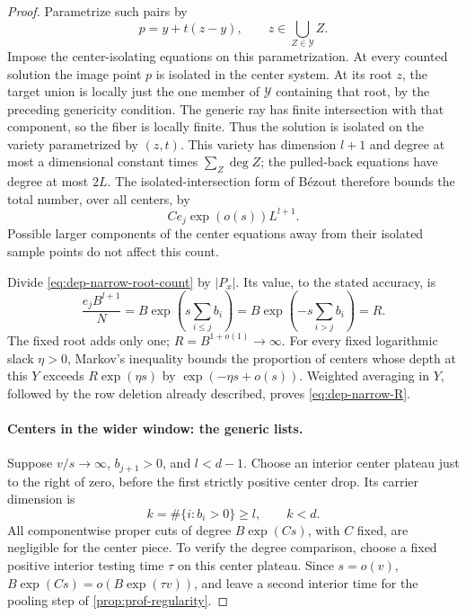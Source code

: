 \begin{proof}
Parametrize such pairs by
\[
 p=y+t(z-y),\qquad z\in\bigcup_{Z\in\mathcal{Y}}Z.
\]
Impose the center-isolating equations on this parametrization. At every counted solution the image point $p$ is isolated in the center system. At its root $z$, the target union is locally just the one member of $\mathcal{Y}$ containing that root, by the preceding genericity condition. The generic ray has finite intersection with that component, so the fiber is locally finite. Thus the solution is isolated on the variety parametrized by $(z,t)$. This variety has dimension $l+1$ and degree at most a dimensional constant times $\sum_Z\deg Z$; the pulled-back equations have degree at most $2L$. The isolated-intersection form of B\'ezout therefore bounds the total number, over all centers, by
\begin{equation}\label{eq:dep-narrow-root-count}
 C e_j\exp(o(s))L^{l+1}.
\end{equation}
Possible larger components of the center equations away from their isolated sample points do not affect this count.

Divide \eqref{eq:dep-narrow-root-count} by $|P_x|$. Its value, to the stated accuracy, is
\[
 \frac{e_j B^{l+1}}{N}
 =B\exp\left(s\sum_{i\le j}b_i\right)
 =B\exp\left(-s\sum_{i>j}b_i\right)=R.
\]
The fixed root adds only one; $R=B^{1+o(1)}\to\infty$. For every fixed logarithmic slack $\eta>0$, Markov's inequality bounds the proportion of centers whose depth at this $Y$ exceeds $R\exp(\eta s)$ by $\exp(-\eta s+o(s))$. Weighted averaging in $Y$, followed by the row deletion already described, proves \eqref{eq:dep-narrow-R}.

\paragraph{Centers in the wider window: the generic lists.}
Suppose $v/s\to\infty$, $b_{j+1}>0$, and $l<d-1$. Choose an interior center plateau just to the right of zero, before the first strictly positive center drop. Its carrier dimension is
\[
 k=\#\{i:b_i>0\}\ge l,
 \qquad k<d.
\]
All componentwise proper cuts of degree $B\exp(Cs)$, with $C$ fixed, are negligible for the center piece. To verify the degree comparison, choose a fixed positive interior testing time $\tau$ on this center plateau. Since $s=o(v)$, $B\exp(Cs)=o(B\exp(\tau v))$, and leave a second interior time for the pooling step of \cref{prop:prof-regularity}.


\end{proof}
